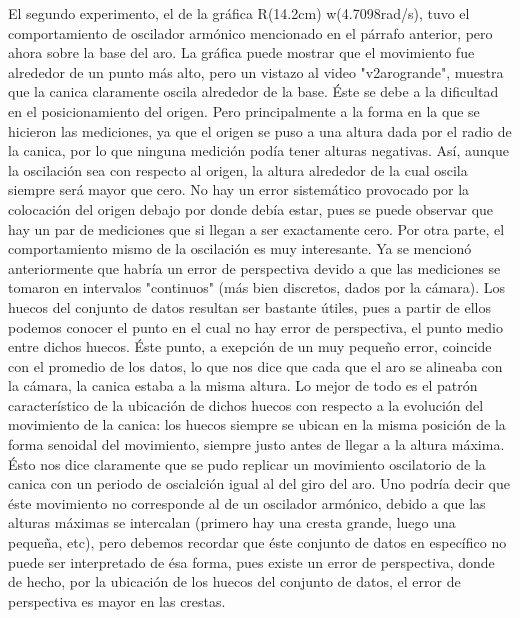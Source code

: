 \documentclass[12p]{article}
\begin{document}
El segundo experimento, el de la gráfica R(14.2cm) w(4.7098rad/s), tuvo el comportamiento de oscilador armónico mencionado en el párrafo anterior, pero ahora sobre la base del aro. La gráfica puede mostrar que el movimiento fue alrededor de un punto más alto, pero un vistazo al video "v2arogrande", muestra que la canica claramente oscila alrededor de la base. Éste se debe a la dificultad en el posicionamiento del origen. Pero principalmente a la forma en la que se hicieron las mediciones, ya que el origen se puso a una altura dada por el radio de la canica, por lo que ninguna medición podía tener alturas negativas. Así, aunque la oscilación sea con respecto al origen, la altura alrededor de la cual oscila siempre será mayor que cero. No hay un error sistemático provocado por la colocación del origen debajo por donde debía estar, pues se puede observar que hay un par de mediciones que si llegan a ser exactamente cero. Por otra parte, el comportamiento mismo de la oscilación es muy interesante. Ya se mencionó anteriormente que habría un error de perspectiva devido a que las mediciones se tomaron en intervalos "continuos" (más bien discretos, dados por la cámara). Los huecos del conjunto de datos resultan ser bastante útiles, pues a partir de ellos podemos conocer el punto en el cual no hay error de perspectiva, el punto medio entre dichos huecos. Éste punto, a exepción de un muy pequeño error, coincide con el promedio de los datos, lo que nos dice que cada que el aro se alineaba con la cámara, la canica estaba a la misma altura. Lo mejor de todo es el patrón característico de la ubicación de dichos huecos con respecto a la evolución del movimiento de la canica: los huecos siempre se ubican en la misma posición de la forma senoidal del movimiento, siempre justo antes de llegar a la altura máxima. Ésto nos dice claramente que se pudo replicar un movimiento oscilatorio de la canica con un periodo de oscialción igual al del giro del aro. Uno podría decir que éste movimiento no corresponde al de un oscilador armónico, debido a que las alturas máximas se intercalan (primero hay una cresta grande, luego una pequeña, etc), pero debemos recordar que éste conjunto de datos en específico no puede ser interpretado de ésa forma, pues existe un error de perspectiva, donde de hecho, por la ubicación de los huecos del conjunto de datos, el error de perspectiva es mayor en las crestas.
\end{document}
